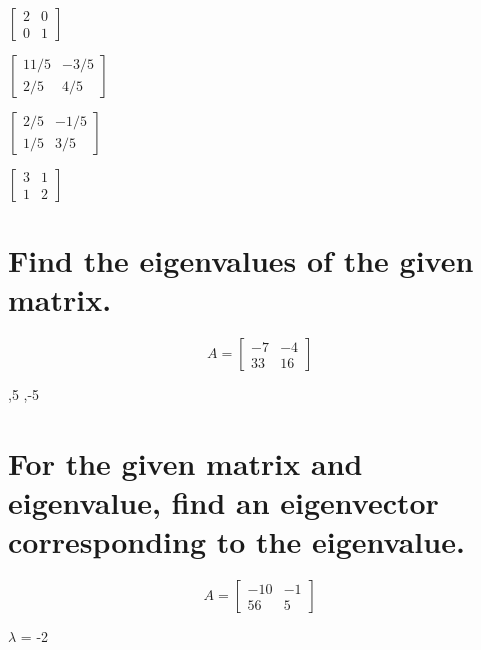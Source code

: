 \documentclass{exam}
\begin{document}
\begin{oneparchoices}
  \choice $\begin{bmatrix}
            2 & 0 \\
            0 & 1
          \end{bmatrix}$

  \choice $\begin{bmatrix}
            11/5 & -3/5 \\
            2/5 & 4/5
          \end{bmatrix}$

  \choice $\begin{bmatrix}
            2/5 & -1/5 \\
            1/5 & 3/5
          \end{bmatrix}$

  \choice $\begin{bmatrix}
            3 & 1 \\
            1 & 2
          \end{bmatrix}$
\end{oneparchoices}

\section{Find the eigenvalues of the given matrix.}
\[
  A=
\left[ {\begin{array}{cc}
   -7 & -4 \\
   33 & 16
  \end{array} } \right]
\]
\begin{oneparchoices}
 ,5
 ,-5
\end{oneparchoices}

\section{For the given matrix and eigenvalue, find an eigenvector corresponding to the eigenvalue.}
\[
  A=
\left[ {\begin{array}{cc}
   -10 & -1 \\
   56 & 5
  \end{array} } \right]
\]

\begin{center}
\(\lambda\) = -2
\end{center}
\end{document}
